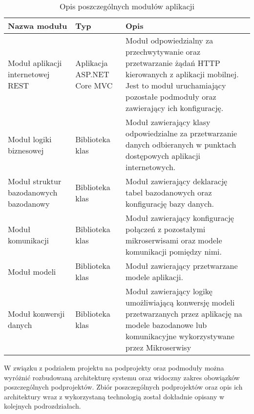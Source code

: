 {\begin{table}[htbp]
	\caption{Opis poszczególnych modułów aplikacji}
	\label{project-architecture}
	\begin{center}
		\begin{tabular}{ | p{3cm}| p{3cm} | p{6cm} |}
			\hline Nazwa modułu & Typ &  Opis \\ \hline   
			
			\hline  Moduł aplikacji internetowej REST &  Aplikacja ASP.NET Core MVC & Moduł odpowiedzialny za przechwytywanie oraz przetwarzanie żądań HTTP kierowanych z aplikacji mobilnej. Jest to moduł uruchamiający pozostałe podmoduły oraz zawierający ich konfigurację.\\ \hline
			
			\hline  Moduł logiki biznesowej & Biblioteka klas & Moduł zawierający klasy odpowiedzialne za przetwarzanie danych odbieranych w punktach dostępowych aplikacji internetowych. \\ \hline
			
			\hline Moduł struktur bazodanowych  \mbox{bazodanowy} & Biblioteka klas & Moduł zawierający deklarację tabel bazodanowych oraz konfigurację bazy danych.\\ \hline
			
			\hline Moduł komunikacji & Biblioteka klas & Moduł zawierający konfigurację połączeń z pozostałymi mikroserwisami oraz modele komunikacji pomiędzy nimi.\\ \hline
			
			\hline Moduł modeli & Biblioteka klas & Moduł zawierający przetwarzane modele aplikacji.\\ \hline
			
			
			\hline Moduł konwersji danych & Biblioteka klas & Moduł zawierający logikę umożliwiającą konwersję modeli przetwarzanych przez aplikację na modele bazodanowe lub komunikacyjne wykorzystywane przez Mikroserwisy\\ \hline

		\end{tabular}
	\end{center}
\end{table}	

W związku z podziałem projektu na podprojekty oraz podmoduły można wyróżnić rozbudowaną architekturę systemu oraz widoczny zakres obowiązków poszczególnych podprojektów. Zbiór poszczególnych podprojektów oraz opis ich architektury wraz z wykorzystaną technologią został dokładnie opisany w kolejnych podrozdziałach.}


